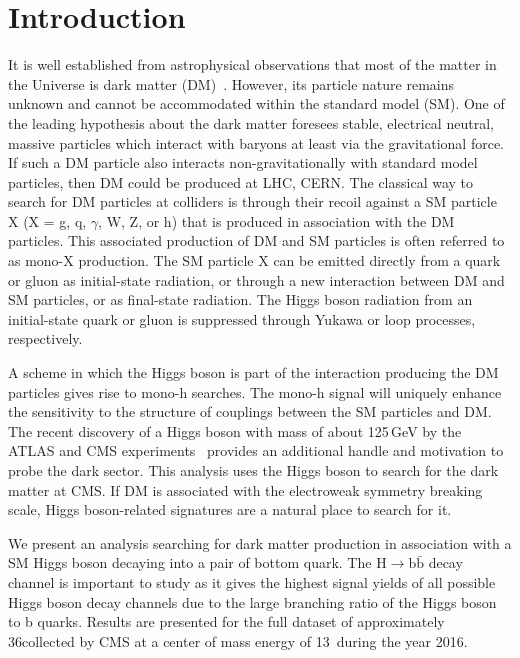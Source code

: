 \newpage 
\section{Introduction}

It is well established from astrophysical observations that most of the matter in the Universe is dark matter (DM)~\cite{FNAL_Review}.
However, its particle nature remains unknown and cannot be accommodated within the standard model (SM). One of the leading hypothesis about the dark matter foresees stable, electrical neutral, massive particles which interact with baryons at least via the gravitational force. If such a DM particle
also interacts non-gravitationally with standard model particles, then DM could be produced at LHC, CERN. The classical way to search for DM particles at colliders
is through their recoil against a SM particle X (X = g, q, $\gamma$, W, Z, or h) that is produced in association with the DM particles.
This associated production of DM and SM particles is often referred to as mono-X production. The SM particle X can be emitted directly from a quark or
gluon as initial-state radiation, or through a new interaction between DM and SM particles, or as final-state radiation. The Higgs boson
 radiation from an initial-state quark or gluon is suppressed through Yukawa or loop processes, respectively.

A scheme in which the Higgs boson is part of the interaction producing the DM particles gives rise to mono-h searches. The mono-h signal will uniquely enhance
the sensitivity to the structure of couplings between the SM particles and DM. The recent discovery of a Higgs boson with mass of
about 125\,GeV by the ATLAS and CMS experiments~\cite{HiggsObs_ATLAS, HiggsObs_CMS, HiggsObs_CMS_Long} provides an additional handle and motivation to probe the dark sector. This analysis uses the Higgs boson to search for the dark matter at CMS. If DM is associated with the electroweak symmetry breaking scale, Higgs boson-related signatures are a natural
place to search for it.

We present an analysis searching for dark matter production in association with a SM Higgs boson decaying into a pair of bottom quark. The H$\rightarrow \text{b} \bar{\text{b}}$ decay channel is important to study as it gives the highest signal yields of all possible Higgs boson decay channels due to the large branching ratio of the Higgs boson to b quarks. Results are presented for the full dataset of approximately 36\fbinv collected by CMS at a center of mass energy of 13\TeV~during the year 2016. 

